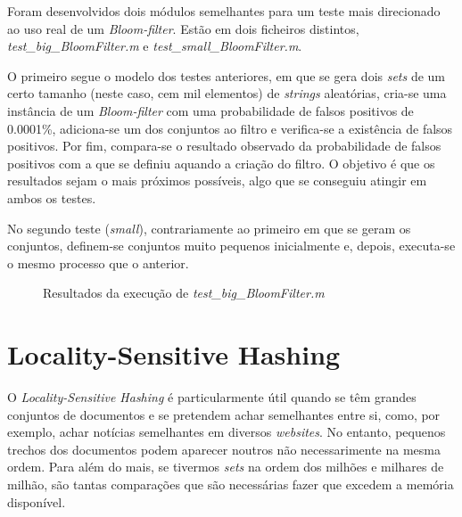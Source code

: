 \documentclass[a4paper,11pt,openright,oneside]{report}
\begin{document}
Foram desenvolvidos dois módulos semelhantes para um teste mais direcionado ao uso real de um \textit{Bloom-filter}. Estão em dois ficheiros distintos, \textit{test\_big\_BloomFilter.m} e \textit{test\_small\_BloomFilter.m}.

O primeiro segue o modelo dos testes anteriores, em que se gera dois \textit{sets} de um certo tamanho (neste caso, cem mil elementos) de \textit{strings} aleatórias, cria-se uma instância de um \textit{Bloom-filter} com uma probabilidade de falsos positivos de 0.0001\%, adiciona-se um dos conjuntos ao filtro e verifica-se a existência de falsos positivos. Por fim, compara-se o resultado observado da probabilidade de falsos positivos com a que se definiu aquando a criação do filtro. O objetivo é que os resultados sejam o mais próximos possíveis, algo que se conseguiu atingir em ambos os testes.

No segundo teste (\textit{small}), contrariamente ao primeiro em que se geram os conjuntos, definem-se conjuntos muito pequenos inicialmente e, depois, executa-se o mesmo processo que o anterior.

\begin{figure}[ht]	
\center
{}
\caption{Resultados da execução de \textit{test\_big\_BloomFilter.m}}
\label{fig:testbigbloom}
\end{figure}


\section{Locality-Sensitive Hashing}
\label{sec.lsh}

O \textit{Locality-Sensitive Hashing} é particularmente útil quando se têm grandes conjuntos de documentos e se pretendem achar semelhantes entre si, como, por exemplo, achar notícias semelhantes em diversos \textit{websites}. No entanto, pequenos trechos dos documentos podem aparecer noutros não necessarimente na mesma ordem. Para além do mais, se tivermos \textit{sets} na ordem dos milhões e milhares de milhão, são tantas comparações que são necessárias fazer que excedem a memória disponível.
\end{document}
